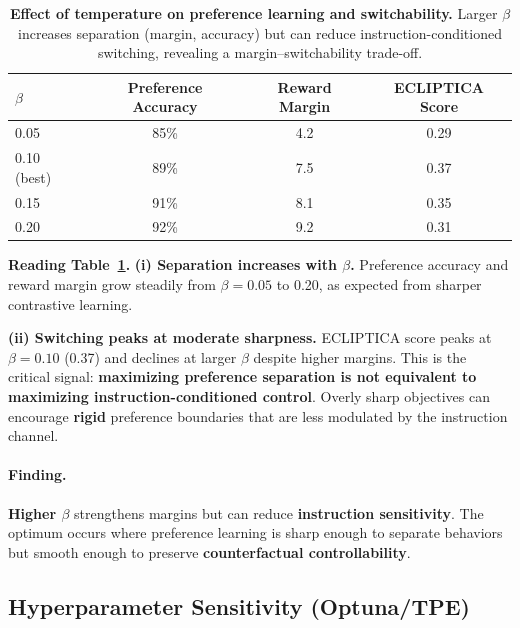 \begin{table}[H]
\centering
\small
\renewcommand{\arraystretch}{1.2}
\begin{tabular}{@{}lccc@{}}
\toprule
\textbf{$\beta$} & \textbf{Preference Accuracy} & \textbf{Reward Margin} & \textbf{ECLIPTICA Score} \\
\midrule
0.05 & 85\% & 4.2 & 0.29 \\ \hline
0.10 (best) & 89\% & 7.5 & 0.37 \\ \hline
0.15 & 91\% & 8.1 & 0.35 \\ \hline
0.20 & 92\% & 9.2 & 0.31 \\
\bottomrule
\end{tabular}
\caption{\textbf{Effect of temperature on preference learning and switchability.} Larger $\beta$ increases separation (margin, accuracy) but can reduce instruction-conditioned switching, revealing a margin--switchability trade-off.}
\label{tab:beta_ablation}
\end{table}

\vspace{-0.35em}
\noindent\textbf{Reading Table~\ref{tab:beta_ablation}.}
\textbf{(i) Separation increases with $\beta$.}
Preference accuracy and reward margin grow steadily from $\beta=0.05$ to 0.20, as expected from sharper contrastive learning.

\vspace{-0.25em}
\noindent
\textbf{(ii) Switching peaks at moderate sharpness.}
ECLIPTICA score peaks at $\beta=0.10$ (0.37) and declines at larger $\beta$ despite higher margins.
This is the critical signal: \textbf{maximizing preference separation is not equivalent to maximizing instruction-conditioned control}.
Overly sharp objectives can encourage \textbf{rigid} preference boundaries that are less modulated by the instruction channel.

\vspace{-0.15em}
\paragraph{\textbf{Finding.}}
\textbf{Higher $\beta$} strengthens margins but can reduce \textbf{instruction sensitivity}.
The optimum occurs where preference learning is sharp enough to separate behaviors but smooth enough to preserve \textbf{counterfactual controllability}.

\subsection{Hyperparameter Sensitivity (Optuna/TPE)}

